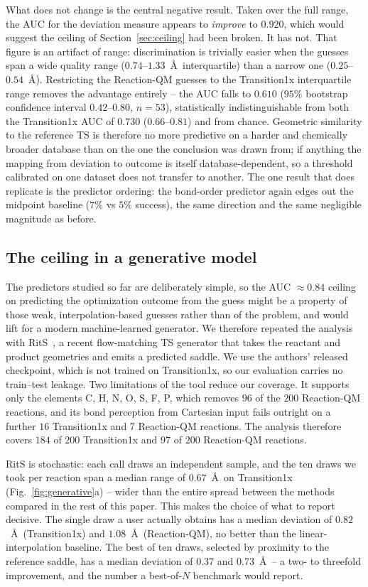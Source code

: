 \documentclass[11pt]{article}
\begin{document}
What does not change is the central negative result. Taken over the full range,
the AUC for the deviation
measure appears to \emph{improve} to $0.920$, which would suggest the ceiling of
Section~\ref{sec:ceiling} had been broken. It has not. That figure is an artifact
of range: discrimination is trivially easier when the guesses span a wide quality
range ($0.74$--$1.33$~\AA\ interquartile) than a narrow one
($0.25$--$0.54$~\AA). Restricting the Reaction-QM guesses to the Transition1x
interquartile range removes the advantage entirely -- the AUC
falls to $0.610$ ($95\%$ bootstrap confidence interval $0.42$--$0.80$, $n=53$),
statistically indistinguishable from both the Transition1x AUC of $0.730$
($0.66$--$0.81$) and from chance. Geometric similarity to the reference
TS is therefore no more predictive on a harder and chemically
broader database than on the one the conclusion was drawn from; if anything the
mapping from deviation to outcome is itself database-dependent, so a threshold
calibrated on one dataset does not transfer to another.
The one result that does replicate is the predictor ordering: the bond-order
predictor again edges out the midpoint baseline ($7\%$ vs $5\%$ success), the
same direction and the same negligible magnitude as before.

\subsection{The ceiling in a generative model}
\label{sec:generative}
The predictors studied so far are deliberately simple, so the AUC $\approx 0.84$
ceiling on predicting the optimization outcome from the guess might be a property
of those weak, interpolation-based guesses rather than of the problem, and would
lift for a modern machine-learned generator. We therefore repeated the analysis
with RitS~\cite{RitS}, a recent flow-matching TS generator that takes the
reactant and product geometries and emits a predicted saddle. We use the authors'
released checkpoint, which is not trained on Transition1x, so our evaluation
carries no train--test leakage. Two limitations of the tool reduce our
coverage. It supports only the elements C, H, N, O, S, F, P, which removes $96$
of the $200$ Reaction-QM reactions, and its bond perception from
Cartesian input fails outright on a further $16$ Transition1x and $7$ Reaction-QM
reactions. The analysis therefore covers $184$ of $200$ Transition1x and $97$ of
$200$ Reaction-QM reactions.

RitS is stochastic: each call draws
an independent sample, and the ten draws we took per reaction span a median
range of $0.67$~\AA\ on Transition1x (Fig.~\ref{fig:generative}a) -- wider than
the entire spread between the methods compared in the rest of this paper. This
makes the choice of what to report decisive. The single draw a user actually
obtains has a median deviation of $0.82$~\AA\ (Transition1x) and $1.08$~\AA\
(Reaction-QM), no better than the linear-interpolation baseline. The
best of ten draws, selected by proximity to the reference saddle, has a
median deviation of $0.37$ and $0.73$~\AA\ -- a two- to threefold improvement,
and the number a best-of-$N$ benchmark would report.
\end{document}
